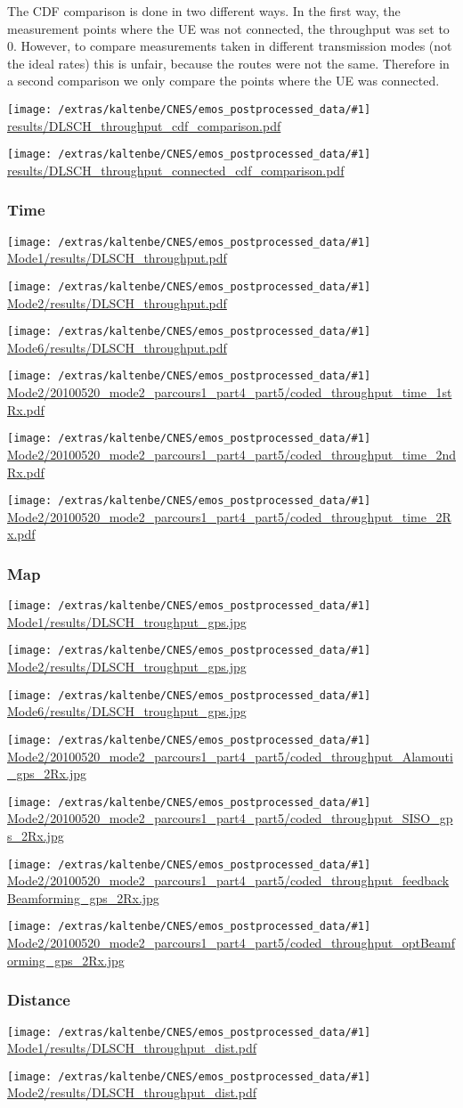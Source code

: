 \documentclass[a4paper,10pt]{article}
\newcommand{\printfile}[1]{
 \begin{minipage}{8cm}
  \centering
  \texttt{[image: /extras/kaltenbe/CNES/emos\_postprocessed\_data/\#1]}
  \url{#1}

 \end{minipage}
}
\begin{document}
The CDF comparison is done in two different ways. In the first way, the measurement points where the UE was not connected, the throughput was set to 0. However, to compare measurements taken in different transmission modes (not the ideal rates) this is unfair, because the routes were not the same. Therefore in a second comparison we only compare the points where the UE was connected.

\printfile{results/DLSCH_throughput_cdf_comparison.pdf}
\printfile{results/DLSCH_throughput_connected_cdf_comparison.pdf}

\subsubsection{Time}

\printfile{Mode1/results/DLSCH_throughput.pdf}
\printfile{Mode2/results/DLSCH_throughput.pdf}

\printfile{Mode6/results/DLSCH_throughput.pdf}
\printfile{Mode2/20100520_mode2_parcours1_part4_part5/coded_throughput_time_1stRx.pdf}

\printfile{Mode2/20100520_mode2_parcours1_part4_part5/coded_throughput_time_2ndRx.pdf}
\printfile{Mode2/20100520_mode2_parcours1_part4_part5/coded_throughput_time_2Rx.pdf}


\subsubsection{Map}

\printfile{Mode1/results/DLSCH_troughput_gps.jpg}
\printfile{Mode2/results/DLSCH_troughput_gps.jpg}

\printfile{Mode6/results/DLSCH_troughput_gps.jpg}

\printfile{Mode2/20100520_mode2_parcours1_part4_part5/coded_throughput_Alamouti_gps_2Rx.jpg}
\printfile{Mode2/20100520_mode2_parcours1_part4_part5/coded_throughput_SISO_gps_2Rx.jpg}

\printfile{Mode2/20100520_mode2_parcours1_part4_part5/coded_throughput_feedbackBeamforming_gps_2Rx.jpg}
\printfile{Mode2/20100520_mode2_parcours1_part4_part5/coded_throughput_optBeamforming_gps_2Rx.jpg}


\subsubsection{Distance}

\printfile{Mode1/results/DLSCH_throughput_dist.pdf}
\printfile{Mode2/results/DLSCH_throughput_dist.pdf}
\end{document}
